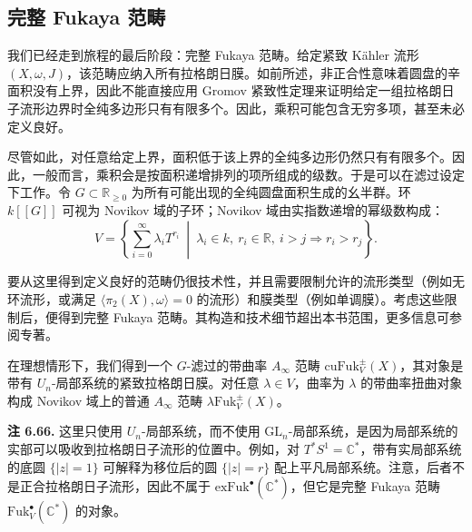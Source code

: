 \subsection{完整 Fukaya 范畴}\label{subsec:full-fukaya}
我们已经走到旅程的最后阶段：完整 Fukaya 范畴。给定紧致 Kähler 流形 $(X,\omega,J)$，该范畴应纳入所有拉格朗日膜。如前所述，非正合性意味着圆盘的辛面积没有上界，因此不能直接应用 Gromov 紧致性定理来证明给定一组拉格朗日子流形边界时全纯多边形只有有限多个。因此，乘积可能包含无穷多项，甚至未必定义良好。

尽管如此，对任意给定上界，面积低于该上界的全纯多边形仍然只有有限多个。因此，一般而言，乘积会是按面积递增排列的项所组成的级数。于是可以在滤过设定下工作。令 $G\subset\mathbb R_{\ge0}$ 为所有可能出现的全纯圆盘面积生成的幺半群。环 $k[[G]]$ 可视为 Novikov 域的子环；Novikov 域由实指数递增的幂级数构成：
\[
  V=\left\{\sum_{i=0}^{\infty}\lambda_iT^{r_i}\ \middle|\ 
  \lambda_i\in k,\ r_i\in\mathbb R,\ i>j\Rightarrow r_i>r_j\right\}.
\]

要从这里得到定义良好的范畴仍很技术性，并且需要限制允许的流形类型（例如无环流形，或满足 $\langle\pi_2(X),\omega\rangle=0$ 的流形）和膜类型（例如单调膜）。考虑这些限制后，便得到完整 Fukaya 范畴。其构造和技术细节超出本书范围，更多信息可参阅专著。

在理想情形下，我们得到一个 $G$-滤过的带曲率 $A_\infty$ 范畴 $\mathrm{cuFuk}^{\pm}_V(X)$，其对象是带有 $U_n$-局部系统的紧致拉格朗日膜。对任意 $\lambda\in V$，曲率为 $\lambda$ 的带曲率扭曲对象构成 Novikov 域上的普通 $A_\infty$ 范畴 $\lambda\mathrm{Fuk}^{\pm}_V(X)$。

\begin{note}\label{note:unitary-local-systems}
\textbf{注 6.66.} 这里只使用 $U_n$-局部系统，而不使用 $\mathrm{GL}_n$-局部系统，是因为局部系统的实部可以吸收到拉格朗日子流形的位置中。例如，对 $T^*S^1=\mathbb C^*$，带有实局部系统的底圆 $\{|z|=1\}$ 可解释为移位后的圆 $\{|z|=r\}$ 配上平凡局部系统。注意，后者不是正合拉格朗日子流形，因此不属于 $\mathrm{exFuk}^\bullet(\mathbb C^*)$，但它是完整 Fukaya 范畴 $\mathrm{Fuk}^\bullet_V(\mathbb C^*)$ 的对象。
\end{note}

